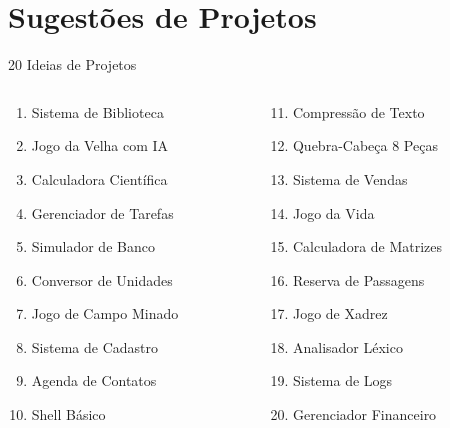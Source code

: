 \documentclass[10pt]{beamer}
\begin{document}
\section{Sugestões de Projetos}

\begin{frame}{20 Ideias de Projetos}
	\begin{columns}
		\begin{column}{0.5\textwidth}
			\begin{enumerate}
				\item Sistema de Biblioteca
				\item Jogo da Velha com IA
				\item Calculadora Científica
				\item Gerenciador de Tarefas
				\item Simulador de Banco
				\item Conversor de Unidades
				\item Jogo de Campo Minado
				\item Sistema de Cadastro
				\item Agenda de Contatos
				\item Shell Básico
			\end{enumerate}
		\end{column}
		\begin{column}{0.5\textwidth}
			\begin{enumerate}
				\setcounter{enumi}{10}
				\item Compressão de Texto
				\item Quebra-Cabeça 8 Peças
				\item Sistema de Vendas
				\item Jogo da Vida
				\item Calculadora de Matrizes
				\item Reserva de Passagens
				\item Jogo de Xadrez
				\item Analisador Léxico
				\item Sistema de Logs
				\item Gerenciador Financeiro
			\end{enumerate}
		\end{column}
	\end{columns}
\end{frame}
\end{document}
